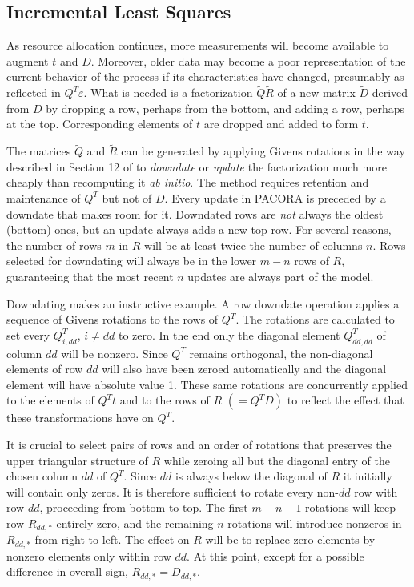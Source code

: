 \subsection*{Incremental Least Squares}

As resource allocation continues, more measurements will become available to augment $t$ and $D$.
Moreover, older data may become a poor representation of the current behavior of the process if its characteristics have changed,
presumably as reflected in $Q^T\varepsilon$.
What is needed is a factorization $\tilde{Q}\tilde{R}$ of a new matrix $\tilde{D}$
derived from $D$ by dropping a row, perhaps from the bottom,
and adding a row, perhaps at the top.
Corresponding elements of $t$ are dropped and added to form $\tilde{t}$.

The matrices $\tilde{Q}$ and $\tilde{R}$ can be generated by applying Givens rotations
in the way described in Section 12 of \cite{GoVL} to \emph{downdate} or \emph{update} the factorization
much more cheaply than recomputing it \emph{ab initio}.
The method requires retention and maintenance of $Q^T$ but not of $D$.
Every update in PACORA is preceded by a downdate that makes room for it.
Downdated rows are \emph{not} always the oldest (bottom) ones, but
an update always adds a new top row.
For several reasons, the number of rows $m$ in $R$
will be at least twice the number of columns $n$.
Rows selected for downdating will always be in the lower $m - n$ rows of $R$,
guaranteeing that the most recent $n$ updates are always part of the model.

Downdating makes an instructive example. A row downdate operation applies
a sequence of Givens rotations to the rows of $Q^T$.
The rotations are calculated to set every $Q^T_{i,dd}$, $i \neq dd$ to zero.
In the end only the diagonal element $Q^T_{dd,dd}$ of column $dd$ will be nonzero.
Since $Q^T$ remains orthogonal, the non-diagonal elements of row $dd$ will also have been zeroed automatically
and the diagonal element will have absolute value 1.
These same rotations are concurrently applied to the elements of $Q^T t$ and to the rows of $R$ $(= Q^T D)$
to reflect the effect that these transformations have on $Q^T$.

It is crucial to select pairs of rows and an order of rotations that preserves the upper triangular structure of $R$
while zeroing all but the diagonal entry of the chosen column $dd$ of $Q^T$.
Since $dd$ is always below the diagonal of $R$ it initially will contain only zeros.
It is therefore sufficient to rotate every non-$dd$ row with row $dd$, proceeding from bottom to top.
The first $m - n - 1$ rotations will keep row $R_{dd,*}$ entirely zero,
and the remaining $n$ rotations will introduce nonzeros in $R_{dd,*}$ from right to left.
The effect on $R$ will be to replace zero elements by nonzero elements only within row $dd$.
At this point, except for a possible difference in overall sign, $R_{dd,*} = D_{dd,*}$.

